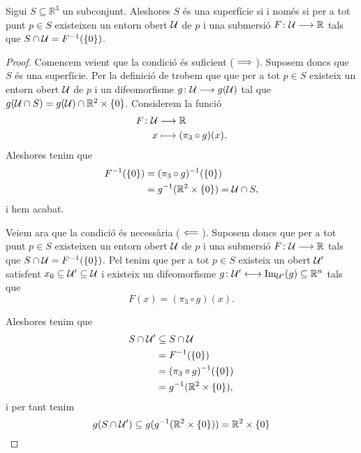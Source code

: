 \documentclass[../Apunts.tex]{subfiles}
\begin{document}
	\begin{theorem}
		\label{thm:condicions equivalents a la definició de superfície}
		Sigui \(S\subseteq\mathbb{R}^{3}\) un subconjunt. Aleshores \(S\) és una superfície si i només si per a tot punt \(p\in S\) existeixen un entorn obert \(\mathcal{U}\) de \(p\) i una submersió \(F\colon\mathcal{U}\longrightarrow\mathbb{R}\) tals que \(S\cap\mathcal{U}=F^{-1}(\{0\})\).
		\begin{proof}
			Comencem veient que la condició és suficient (\(\implies\)). Suposem doncs que \(S\) és una superfície. Per la definició de  trobem que que per a tot \(p\in S\) existeix un entorn obert \(\mathcal{U}\) de \(p\) i un difeomorfisme \(g\colon\mathcal{U}\longrightarrow g(\mathcal{U})\) tal que \(g(\mathcal{U}\cap S)=g(\mathcal{U})\cap\mathbb{R}^{2}\times\{0\}\). Considerem la funció
			\begin{align*}
				F\colon\mathcal{U}&\longrightarrow\mathbb{R} \\
				x&\longmapsto(\pi_{3}\circ g)(x).
			\end{align*}
			Aleshores tenim que
			\begin{align*}
				F^{-1}(\{0\})&=(\pi_{3}\circ g)^{-1}(\{0\}) \\
				&=g^{-1}(\mathbb{R}^{2}\times\{0\})=\obert{U}\cap S, %
			\end{align*}
			i hem acabat.
			
			Veiem ara que la condició és necessària (\(\impliedby\)). Suposem doncs que per a tot punt \(p\in S\) existeixen un entorn obert \(\mathcal{U}\) de \(p\) i una submersió \(F\colon\mathcal{U}\longrightarrow\mathbb{R}\) tals que \(S\cap\mathcal{U}=F^{-1}(\{0\})\). Pel  tenim que per a tot \(p\in S\) existeix un obert \(\mathcal{U}'\) satisfent \(x_{0}\subseteq\mathcal{U}'\subseteq\mathcal{U}\) i existeix un difeomorfisme \(g\colon\mathcal{U}'\longleftrightarrow\operatorname{Im}_{\mathcal{U}'}(g)\subseteq\mathbb{R}^{n}\) tals que
			\[F(x)=(\pi_{3}\circ g)(x).\]
			
			Aleshores tenim que
			\begin{align*}
				S\cap\mathcal{U}'&\subseteq S\cap\mathcal{U}\\
				&=F^{-1}(\{0\}) \\
				&=(\pi_{3}\circ g)^{-1}(\{0\}) \\
				&=g^{-1}(\mathbb{R}^{2}\times\{0\}),
			\end{align*}
			i per tant tenim
			\[g(S\cap\mathcal{U}')\subseteq g(g^{-1}(\mathbb{R}^{2}\times\{0\}))=\mathbb{R}^{2}\times\{0\}\qedhere\]
		\end{proof}
	\end{theorem}
\end{document}
